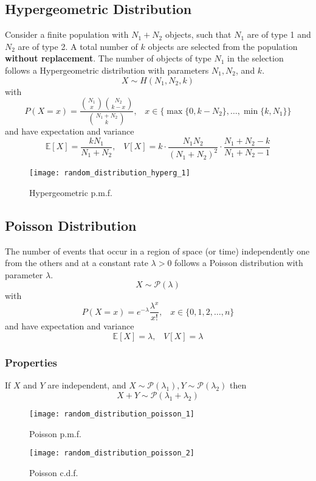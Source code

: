 \subsection{Hypergeometric Distribution}
Consider a finite population with $N_1+N_2$ objects, such that $N_1$ are of type 1 and $N_2$ are of type 2. A total number of $k$
objects are selected from the population \textbf{without replacement}. The number of objects of type $N_1$ in the selection follows 
a Hypergeometric distribution with parameters $N_1, N_2$, and $k$.
\[ X \sim H(N_1,N_2,k)\]
with
\[ P(X=x) = \frac{\binom{N_1}{x}\binom{N_2}{k-x}}{\binom{N_1+N_2}{k}},\;\;\; x \in \{\max\{0,k-N_2\},\dots,\min\{k,N_1\} \} \]
and have expectation and variance
\[ \mathbb{E}[X] = \frac{kN_1}{N_1+N_2},\;\;\; V[X] = k\cdot\frac{N_1N_2}{(N_1+N_2)^2}\cdot\frac{N_1+N_2-k}{N_1+N_2-1} \]

\begin{figure}[!ht]
    \begin{center}
        \texttt{[image: random\_distribution\_hyperg\_1]}
        \caption{Hypergeometric p.m.f.}
    \end{center}
\end{figure}

\subsection{Poisson Distribution}
The number of events that occur in a region of space (or time) independently one from the others and at a constant rate $\lambda >0$ 
follows a Poisson distribution with parameter $\lambda$.
\[ X \sim \mathcal{P}(\lambda)\]
with
\[ P(X=x) = e^{-\lambda}\frac{\lambda^x}{x!},\;\;\; x \in \{0,1,2,\dots,n\} \]
and have expectation and variance
\[ \mathbb{E}[X] = \lambda,\;\;\; V[X] = \lambda \]

\subsubsection{Properties}
If $X$ and $Y$ are independent, and $X \sim \mathcal{P}(\lambda_1), Y \sim \mathcal{P}(\lambda_2)$ then 
\[ X+Y \sim \mathcal{P}(\lambda_1+\lambda_2) \]

\begin{figure}[!ht]
    \begin{minipage}{0.45\linewidth}
      \texttt{[image: random\_distribution\_poisson\_1]}
      \caption{Poisson p.m.f.}
    \end{minipage}
    \hfill
    \begin{minipage}{0.45\linewidth}
      \texttt{[image: random\_distribution\_poisson\_2]}
      \caption{Poisson c.d.f.}
    \end{minipage}
\end{figure}
